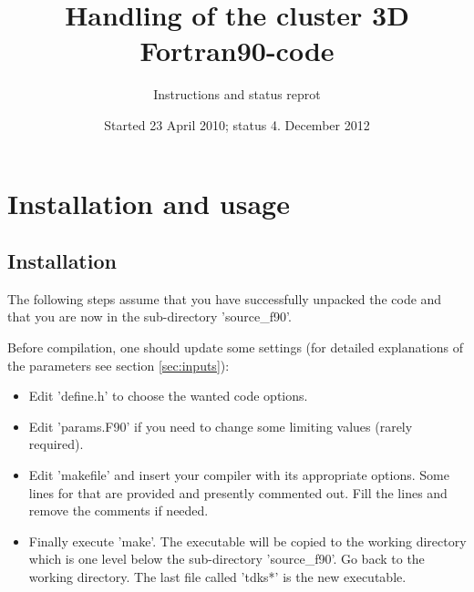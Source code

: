 \documentclass[12pt]{article}
\begin{document}
\title{Handling of the cluster 3D Fortran90-code}
\author{Instructions and status reprot}
\date{Started 23 April 2010; status 4. December 2012}
\maketitle

\tableofcontents
\newpage

\section{Installation and usage}

\subsection{Installation}
The following steps assume that you have successfully unpacked
the code and that you are now in the sub-directory 'source\_f90'.

Before compilation, one should update some settings
(for detailed explanations of the parameters see section \ref{sec:inputs}):
\begin{itemize}
\item
 Edit 'define.h' to choose the wanted code options.
\item
 Edit 'params.F90' if you need to change some limiting values
 (rarely required).
\item
 Edit 'makefile' and insert your compiler with its appropriate
 options. Some lines for that are provided and presently commented out.
 Fill the lines and remove the comments if needed.
\item
 Finally execute 'make'. The executable will be copied to the working
 directory which is one level below the sub-directory 'source\_f90'.
 Go back to the working directory. The last file called 'tdks*' is
 the new executable.
\end{itemize}
\end{document}
